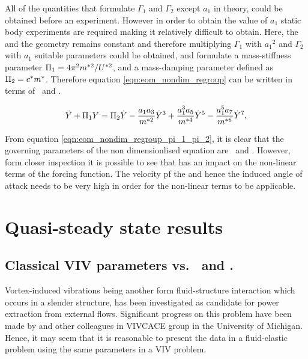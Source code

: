 All of the quantities that formulate $\Gamma_1$ and $\Gamma_2$ except $a_1$ in theory, could be obtained before an experiment. However in order to obtain the value of $a_1$ static body experiments are required making it relatively difficult to obtain. Here, the \reynoldsnumber and the geometry remains constant and therefore multiplying $\Gamma_1$ with ${a_1}^2$ and $\Gamma_2$ with $a_1$ suitable parameters could be obtained, and formulate a mass-stiffness parameter $\Pi_1 =  4\pi^2m^{*2}/U^{*2}$, and a mass-damping parameter defined as $\Pi_2 = c^*m^*$. Therefore equation \ref{eqn:eom_nondim_regroup} can be written in terms of \massstiff \ and \massdamp. 

  \begin{equation}
  \label{eqn:eom_nondim_regroup_pi_1_pi_2}
  \ddot{Y} + \Pi_1 Y = \Pi_2 \dot{Y} - \frac{a_1a_3}{m^{*2}}\dot{Y}^3 + \frac{a_1^3a_5}{m^{*4}}\dot{Y}^5 - \frac{a_1^5a_7}{m^{*6}}\dot{Y}^7,
  \end{equation} 
  
From equation \ref{eqn:eom_nondim_regroup_pi_1_pi_2}, it is clear that the governing parameters of the non dimensionlised equation are \massstiff \ \massdamp and \mstar. However, form closer inspection it is possible to see that \mstar has an impact on the non-linear terms of the forcing function. The velocity pf the and hence the induced angle of attack needs to be very high in order for the non-linear terms to be applicable. 

\section{Quasi-steady state results}
\label{sec:qss_results} 

\subsection{Classical VIV parameters vs. \massstiff \ and \massdamp.}
\label{subsec:compare_data}


Vortex-induced vibrations being another form fluid-structure interaction which occurs in a slender structure, has been investigated as candidate for power extraction from external flows. Significant progress on this problem have been made by \cite{Bernitsas2008a-concept,Bernitsas2009,Raghavan2010a,Lee2011b} and other colleagues in VIVCACE group in the University of Michigan. Hence, it may seem that it is reasonable to present the data in a fluid-elastic problem using the same parameters in a VIV problem.

